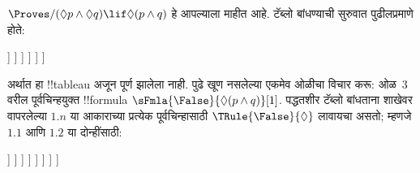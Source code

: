 \documentclass[../../../include/open-logic-section]{subfiles}
\begin{document}
{
\begin{ex}
  $\Proves/ (\Diamond p \land \Diamond q) \lif \Diamond(p
  \land q)$ हे आपल्याला माहीत आहे. टॅब्लो
  बांधण्याची सुरुवात पुढीलप्रमाणे होते:
  \begin{oltableau}
    [\pFmla{\False}{(\Diamond p \land \Diamond q) \lif \Diamond(p \land q)}{1},
      just = \TAss, checked
      [\pFmla{\True}{\Diamond p \land \Diamond q}{1},
        just = {\TRule{\False}{\lif}[1]}, checked
        [\pFmla{\False}{\Diamond(p \land q)}{1},
          just = {\TRule{\False}{\lif}[1]}
          [\pFmla{\True}{\Diamond p}{1},
            just = {\TRule{\True}{\land}[2]}, checked
            [\pFmla{\True}{\Diamond q}{1},
              just = {\TRule{\True}{\land}[2]}, checked
              [\pFmla{\True}{p}{1.1},
                just = {\TRule{\True}{\Diamond}[4]}, checked
                [\pFmla{\True}{q}{1.2},
                  just = {\TRule{\True}{\Diamond}[5]}, checked
                ]
              ]
            ]
          ]
        ]
      ]
    ]
  \end{oltableau}
  अर्थात हा !!{tableau} अजून पूर्ण झालेला नाही.
  पुढे खूण नसलेल्या एकमेव ओळीचा विचार करू:
  ओळ~$3$ वरील पूर्वचिन्हयुक्त !!{formula}
  $\sFmla{\False}{\Diamond(p \land q)}[1]$.
  पद्धतशीर टॅब्लो बांधताना शाखेवर वापरलेल्या
  $1.n$ या आकाराच्या प्रत्येक पूर्वचिन्हासाठी
  $\TRule{\False}{\Diamond}$ लावायचा असतो;
  म्हणजे $1.1$ आणि $1.2$ या दोन्हींसाठी:
  \begin{oltableau}
    [\pFmla{\False}{(\Diamond p \land \Diamond q) \lif \Diamond(p \land q)}{1},
      just = \TAss, checked
      [\pFmla{\True}{\Diamond p \land \Diamond q}{1},
        just = {\TRule{\False}{\lif}[1]}, checked
        [\pFmla{\False}{\Diamond (p \land q)}{1},
          just = {\TRule{\False}{\lif}[1]}
          [\pFmla{\True}{\Diamond p}{1},
            just = {\TRule{\True}{\land}[2]}, checked
            [\pFmla{\True}{\Diamond q}{1},
              just = {\TRule{\True}{\land}[2]}, checked
              [\pFmla{\True}{p}{1.1},
                just = {\TRule{\True}{\Diamond}[4]}, checked
                [\pFmla{\True}{q}{1.2},
                  just = {\TRule{\True}{\Diamond}[5]}, checked
                  [\pFmla{\False}{p \land q}{1.1},
                    just = {\TRule{\False}{\Diamond}[3]}
                    [\pFmla{\False}{p \land q}{1.2},
                      just = {\TRule{\False}{\Diamond}[3]}
                    ]
                  ]
                ]
              ]
            ]
          ]
        ]
      ]
    ]
  \end{oltableau}

\end{ex}}
\end{document}
